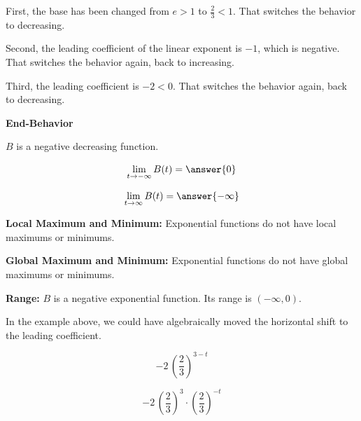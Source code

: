 \documentclass{ximera}
\begin{document}
\begin{example}
First, the base has been changed from $e > 1$ to $\frac{2}{3} < 1$.  That switches the behavior to decreasing.

Second, the leading coefficient of the linear exponent is $-1$, which is negative.  That switches the behavior again, back to increasing.


Third, the leading coefficient is $-2 < 0$. That switches the behavior again, back to decreasing.







\textbf{End-Behavior}


$B$ is a negative decreasing function.



\[
\lim\limits_{t \to -\infty}B(t) = \answer{0}  
\]

\[
\lim\limits_{t \to \infty}B(t) = \answer{-\infty}
\]





\textbf{Local Maximum and Minimum:}  Exponential functions do not have local maximums or minimums.






\textbf{Global Maximum and Minimum:}  Exponential functions do not have global maximums or minimums.




\textbf{Range:}  $B$ is a negative exponential function.   Its range is $(-\infty, 0)$.







\end{example}

























In the example above, we could have algebraically moved the horizontal shift to the leading coefficient.



\[
-2 \, \left( \frac{2}{3} \right)^{3-t}
\]


\[
-2 \, \left( \frac{2}{3} \right)^{3} \cdot \left( \frac{2}{3} \right)^{-t}
\]
\end{document}
